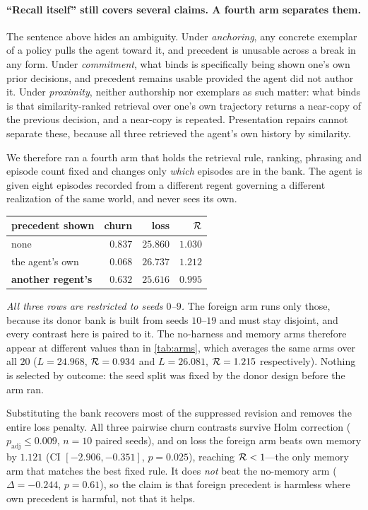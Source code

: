 \documentclass[11pt]{article}
\begin{document}
\paragraph{``Recall itself'' still covers several claims. A fourth arm separates them.}
The sentence above hides an ambiguity. Under \emph{anchoring}, any concrete exemplar of a policy
pulls the agent toward it, and precedent is unusable across a break in any form. Under
\emph{commitment}, what binds is specifically being shown one's own prior decisions, and precedent
remains usable provided the agent did not author it. Under \emph{proximity}, neither authorship nor
exemplars as such matter: what binds is that similarity-ranked retrieval over one's own trajectory
returns a near-copy of the previous decision, and a near-copy is repeated. Presentation repairs
cannot separate these, because all three retrieved the agent's own history by similarity.

We therefore ran a fourth arm that holds the retrieval rule, ranking, phrasing and episode count
fixed and changes only \emph{which} episodes are in the bank. The agent is given eight episodes
recorded from a different regent governing a different realization of the same world, and never sees
its own.

\begin{center}\small
\begin{tabular}{@{}lrrr@{}}
\toprule
precedent shown & churn & loss & $\mathcal{R}$ \\
\midrule
none & $0.837$ & $25.860$ & $1.030$ \\
the agent's own & $0.068$ & $26.737$ & $1.212$ \\
\textbf{another regent's} & $\mathbf{0.632}$ & $\mathbf{25.616}$ & $\mathbf{0.995}$ \\
\bottomrule
\end{tabular}
\end{center}

\noindent\footnotesize\emph{All three rows are restricted to seeds $0$--$9$.} The foreign arm runs
only those, because its donor bank is built from seeds $10$--$19$ and must stay disjoint, and every
contrast here is paired to it. The no-harness and memory arms therefore appear at different values
than in \cref{tab:arms}, which averages the same arms over all $20$ ($L=24.968$, $\mathcal{R}=0.934$ and
$L=26.081$, $\mathcal{R}=1.215$ respectively). Nothing is selected by outcome: the seed split was fixed by
the donor design before the arm ran.\normalsize

\noindent Substituting the bank recovers most of the suppressed revision and removes the entire loss
penalty. All three pairwise churn contrasts survive Holm correction ($p_{\text{adj}} \le 0.009$,
$n=10$ paired seeds), and on loss the foreign arm beats own memory by $1.121$
(CI $[-2.906, -0.351]$, $p = 0.025$), reaching $\mathcal{R} < 1$---the only memory arm that matches the
best fixed rule. It does \emph{not} beat the no-memory arm ($\Delta = -0.244$, $p = 0.61$), so the
claim is that foreign precedent is harmless where own precedent is harmful, not that it helps.
\end{document}
